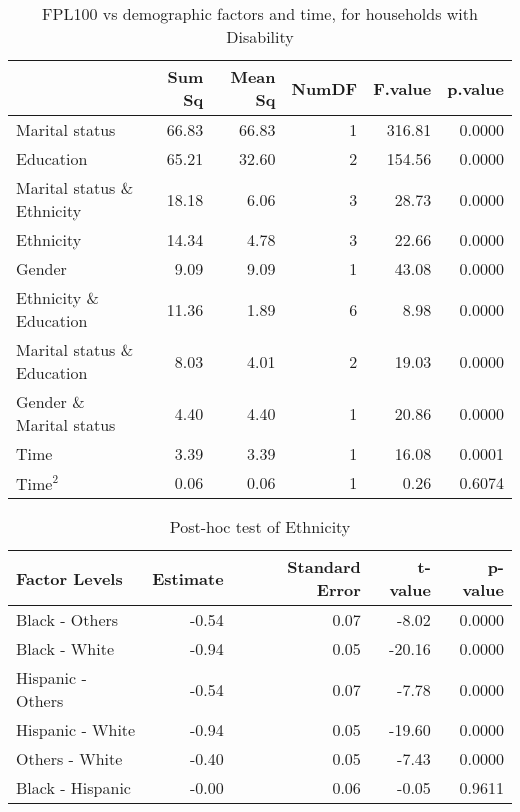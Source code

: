 \begin{table}[H]
\footnotesize
\centering
\caption{FPL100 vs demographic factors and time, for households with Disability} 
\begin{tabular}{lrrrrr}
  \hline
  & Sum Sq & Mean Sq & NumDF & F.value & p.value \\ 
  \hline
  Marital status & 66.83 & 66.83 & 1 & 316.81 & 0.0000 \\ 
  Education & 65.21 & 32.60 & 2 & 154.56 & 0.0000 \\ 
  Marital status \& Ethnicity & 18.18 & 6.06 & 3 & 28.73 & 0.0000 \\ 
  Ethnicity & 14.34 & 4.78 & 3 & 22.66 & 0.0000 \\ 
  Gender & 9.09 & 9.09 & 1 & 43.08 & 0.0000 \\ 
  Ethnicity \& Education & 11.36 & 1.89 & 6 & 8.98 & 0.0000 \\ 
  Marital status \& Education & 8.03 & 4.01 & 2 & 19.03 & 0.0000 \\ 
  Gender \& Marital status & 4.40 & 4.40 & 1 & 20.86 & 0.0000 \\ 
  Time & 3.39 & 3.39 & 1 & 16.08 & 0.0001 \\ 
  $\text{Time}^2$ & 0.06 & 0.06 & 1 & 0.26 & 0.6074 \\ 
  \hline
\end{tabular}
\label{tab:Anova2}
\end{table}

\begin{table}[H]
\footnotesize
\centering
\caption{Post-hoc test of Ethnicity} 
\begin{tabular}{lrrrr}
  \hline
  Factor Levels & Estimate & Standard Error & t-value & p-value \\ 
  \hline
   Black - Others & -0.54 & 0.07 & -8.02 & 0.0000 \\ 
   Black - White & -0.94 & 0.05 & -20.16 & 0.0000 \\ 
   Hispanic - Others & -0.54 & 0.07 & -7.78 & 0.0000 \\ 
   Hispanic - White & -0.94 & 0.05 & -19.60 & 0.0000 \\ 
   Others - White & -0.40 & 0.05 & -7.43 & 0.0000 \\ 
   Black - Hispanic & -0.00 & 0.06 & -0.05 & 0.9611 \\ 
  \hline
\end{tabular}
\label{tab:race_origin}
\end{table}

